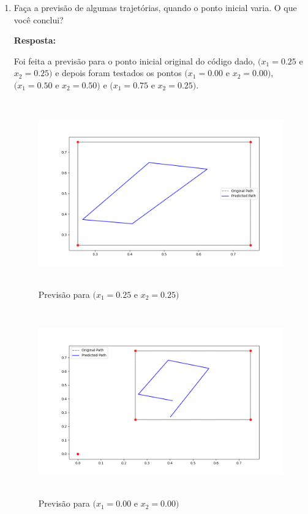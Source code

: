\documentclass[12 pt]{article}
\begin{document}
\begin{enumerate}
    \item Faça a previsão de algumas trajetórias, quando o ponto inicial varia. O que você conclui?
   
    \textbf{Resposta:} \par

    Foi feita a previsão para o ponto inicial original do código dado, $(x_1=0.25$ e $x_2=0.25)$ e depois foram testados os pontos $(x_1=0.00$ e $x_2=0.00)$, $(x_1=0.50$ e $x_2=0.50)$ e $(x_1=0.75$ e $x_2=0.25)$.
    \begin{figure}[H]
        \caption{Previsão para $(x_1=0.25$ e $x_2=0.25)$}
           \centering
           \includegraphics[height=8cm]{fig/Item_3_25_25.png}
    \end{figure}
    \begin{figure}[H]
        \caption{Previsão para $(x_1=0.00$ e $x_2=0.00)$}
           \centering
           \includegraphics[height=8cm]{fig/Item_3_00_00.png}
    \end{figure}
    \begin{figure}[H]

\end{figure}
\end{enumerate}
\end{document}
